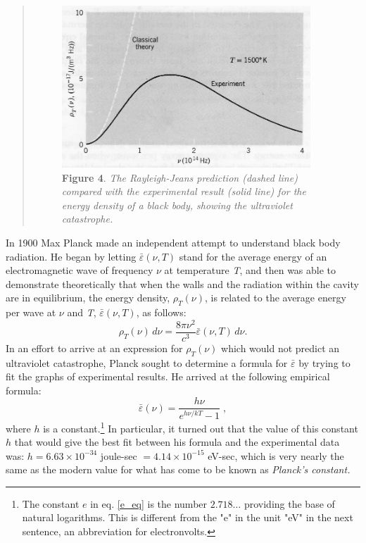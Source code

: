 \begin{quotation}
%
\begin{figure}[h]
  \begin{center}
  \captionsetup{width=3.67708in}
  \includegraphics[width=3.67708in,height=2.39583in]{images/05_planck/image017.jpg}
  \caption*{\textbf{Figure 4}. \emph{The Rayleigh-Jeans prediction (dashed line) compared
    with the experimental result (solid line) for the energy density of a
    black body, showing the ultraviolet catastrophe.}}
  \end{center}
\end{figure}
%
\end{quotation}

In 1900 Max Planck made an independent attempt to understand black body
radiation. He began by letting $\bar{\varepsilon}(\nu, T)$ stand for the average
energy of an electromagnetic wave of frequency $\nu$ at temperature
\emph{T}, and then was able to demonstrate theoretically that when the
walls and the radiation within the cavity are in equilibrium, the energy
density, $\rho_T(\nu)$, is related to the average
energy per wave at $\nu$ and \emph{T}, $\bar{\varepsilon}(\nu, T)$, as follows:
%
\setcounter{equation}{9}
\begin{equation}
\rho_T(\nu)\, d\nu = \frac{8\pi \nu^2}{c^3}\bar{\varepsilon}(\nu, T)\, d\nu. %
\end{equation}
%
In an effort to arrive at an expression for $\rho_T(\nu)$
which would not predict an ultraviolet catastrophe, Planck sought to
determine a formula for $\bar{\varepsilon}$ by trying to fit the graphs of experimental
results. He arrived at the following empirical formula:
\begin{equation}\label{e_eq}
\bar{\varepsilon}(\nu) = \frac{h\nu}{e^{h\nu/kT}-1} \; , %
\end{equation}
where $h$ is a constant.\footnote{The constant $e$ in eq.\! \ref{e_eq} is the number $2.718\dots$ providing the base of natural logarithms. This is different from the "e" in the unit "eV" in the next sentence, an abbreviation for electronvolts.} In particular, it turned out that the
value of this constant $h$ that would give the best fit between his
formula and the experimental data was: $h = 6.63\! \times\!
10^{-34}$ joule-sec $= 4.14\! \times\! 10^{-15}$
eV-sec, which is very nearly the same as the modern value for what has
come to be known as \emph{Planck's constant.}

